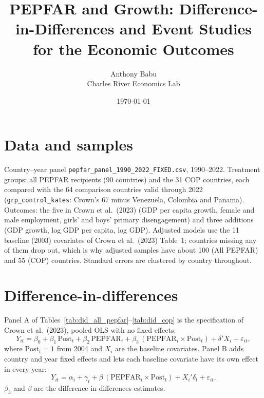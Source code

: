 \documentclass[11pt]{article}
\title{PEPFAR and Growth: Difference-in-Differences and Event Studies\\for the Economic Outcomes}
\author{Anthony Babu\\Charles River Economics Lab}
\date{\today}
\begin{document}
\maketitle

\section*{Data and samples}

Country--year panel \texttt{pepfar\_panel\_1990\_2022\_FIXED.csv}, 1990--2022. Treatment
groups: all PEPFAR recipients (90 countries) and the 31 COP countries, each compared with
the 64 comparison countries valid through 2022 (\texttt{grp\_control\_kates}: Crown's 67
minus Venezuela, Colombia and Panama). Outcomes: the five in Crown et al.\ (2023) (GDP per
capita growth, female and male employment, girls' and boys' primary disengagement) and
three additions (GDP growth, log GDP per capita, log GDP). Adjusted models use the 11
baseline (2003) covariates of Crown et al.\ (2023) Table~1; countries missing any of them
drop out, which is why adjusted samples have about 100 (All PEPFAR) and 55 (COP) countries.
Standard errors are clustered by country throughout.

\section{Difference-in-differences}

Panel A of Tables~\ref{tab:did_all_pepfar}--\ref{tab:did_cop} is the specification of Crown
et al.\ (2023), pooled OLS with no fixed effects:
\begin{equation*}
Y_{it} = \beta_0 + \beta_1\,\text{Post}_t + \beta_2\,\text{PEPFAR}_i
       + \beta_3\,(\text{PEPFAR}_i \times \text{Post}_t) + \delta' X_i + \varepsilon_{it},
\end{equation*}
where $\text{Post}_t = 1$ from 2004 and $X_i$ are the baseline covariates. Panel B adds
country and year fixed effects and lets each baseline covariate have its own effect in
every year:
\begin{equation*}
Y_{it} = \alpha_i + \gamma_t + \beta\,(\text{PEPFAR}_i \times \text{Post}_t)
       + X_i' \delta_t + \varepsilon_{it}.
\end{equation*}
$\beta_3$ and $\beta$ are the difference-in-differences estimates.




\clearpage
\end{document}
